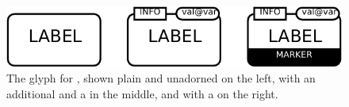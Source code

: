 \begin{figure}[H]
  \centering
  \includegraphics{images/build/macromolecule_combined}
  \caption{The \PD glyph for , shown plain and unadorned on the left, with an additional  and a  in the middle, and with a  on the right.}
  \label{fig:macromolecule}
\end{figure}
